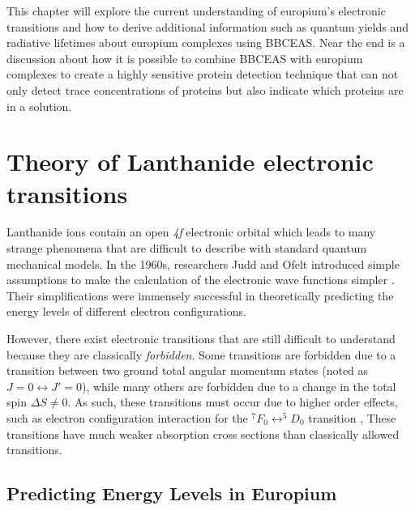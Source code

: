 This chapter will explore the current understanding of europium's electronic
transitions and how to derive additional information such as quantum yields and
radiative lifetimes about europium complexes using \ac{BBCEAS}. Near the end is
a discussion about how it is possible to combine \ac{BBCEAS} with europium
complexes to create a highly sensitive protein detection technique that can not
only detect trace concentrations of proteins but also indicate which proteins
are in a solution.



\section{Theory of Lanthanide electronic transitions}\label{sec:theory_eu}

Lanthanide ions contain an open \textsl{4f} electronic orbital which leads to
many strange phenomena that are difficult to describe with standard quantum
mechanical models\cite{Wybourne:1968ez}. In the 1960s, researchers Judd and
Ofelt introduced simple assumptions to make the calculation of the electronic
wave functions simpler \cite{Judd:1962uq,Ofelt:1962kd}.  Their simplifications
were immensely successful in theoretically predicting the energy levels of
different electron configurations.

However, there exist electronic transitions that are still difficult to
understand because they are classically \emph{forbidden}. Some transitions are
forbidden due to a transition between two ground total angular momentum states
(noted as $ J=0 \leftrightarrow J'=0 $), while many others are forbidden due to
a change in the total spin $\Delta S \neq 0$. As such, these transitions must
occur due to higher order effects, such as electron configuration interaction
for the $^7F_0 \leftrightarrow ^5D_0$ transition \cite{Jankowski:1981es}, These
transitions have much weaker absorption cross sections than classically allowed
transitions.



\subsection{Predicting Energy Levels in Europium}\label{subsec:predict_eu}

